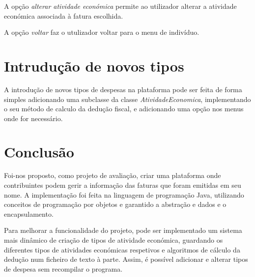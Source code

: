 \documentclass[12pt]{report}
\newcommand\tab[1][0.5cm]{\hspace*{#1}}
\begin{document}
A opção \textit{alterar atividade económica} permite ao utilizador alterar a atividade económica associada à fatura escolhida.

A opção \textit{voltar} faz o utulizador voltar para o menu de indivíduo.

\chapter{Intrudução de novos tipos}
\label{sec:intro}
\tab A introdução de novos tipos de despesas na plataforma pode ser feita de forma simples adicionando uma subclasse da classe \textit{AtividadeEconomica}, implementando o seu método de calculo da dedução fiscal, e adicionando uma opção nos menus onde for necessário.

\chapter{Conclusão}
\label{sec:conclusao}

\tab Foi-nos proposto, como projeto de avaliação, criar uma plataforma onde contribuintes podem gerir a informação das faturas que foram emitidas em seu nome. A implementação foi feita na linguagem de programação Java, utilizando conceitos de programação por objetos e garantido a abstração e dados e o encapsulamento.

Para melhorar a funcionalidade do projeto, pode ser implementado um sistema mais dinâmico de criação de tipos de atividade económica, guardando os diferentes tipos de atividades económicas respetivos e algoritmos de cálculo da dedução num ficheiro de texto à parte. Assim, é possível adicionar e alterar tipos de despesa sem recompilar o programa.
\end{document}
